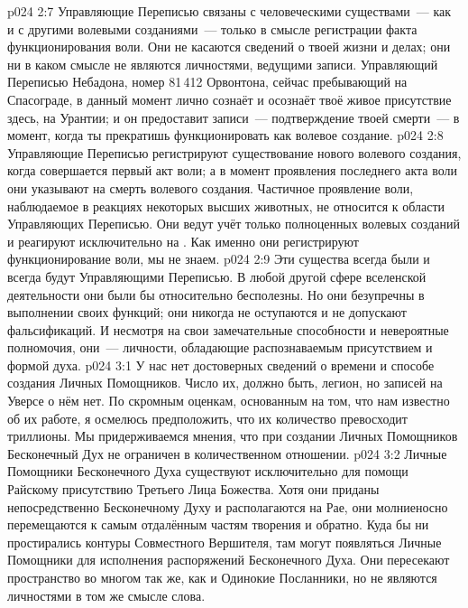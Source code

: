 \vs p024 2:7 \pc Управляющие Переписью связаны с человеческими существами~--- как и с другими волевыми созданиями~--- только в смысле регистрации факта функционирования воли. Они не касаются сведений о твоей жизни и делах; они ни в каком смысле не являются личностями, ведущими записи. Управляющий Переписью Небадона, номер 81\,412 Орвонтона, сейчас пребывающий на Спасограде, в данный момент лично сознаёт и осознаёт твоё живое присутствие здесь, на Урантии; и он предоставит записи~--- подтверждение твоей смерти~--- в момент, когда ты прекратишь функционировать как волевое создание.
\vs p024 2:8 Управляющие Переписью регистрируют существование нового волевого создания, когда совершается первый акт воли; а в момент проявления последнего акта воли они указывают на смерть волевого создания. Частичное проявление воли, наблюдаемое в реакциях некоторых высших животных, не относится к области Управляющих Переписью. Они ведут учёт только полноценных волевых созданий и реагируют исключительно на . Как именно они регистрируют функционирование воли, мы не знаем.
\vs p024 2:9 Эти существа всегда были и всегда будут Управляющими Переписью. В любой другой сфере вселенской деятельности они были бы относительно бесполезны. Но они безупречны в выполнении своих функций; они никогда не оступаются и не допускают фальсификаций. И несмотря на свои замечательные способности и невероятные полномочия, они~--- личности, обладающие распознаваемым присутствием и формой духа.
\vs p024 3:1 У нас нет достоверных сведений о времени и способе создания Личных Помощников. Число их, должно быть, легион, но записей на Уверсе о нём нет. По скромным оценкам, основанным на том, что нам известно об их работе, я осмелюсь предположить, что их количество превосходит триллионы. Мы придерживаемся мнения, что при создании Личных Помощников Бесконечный Дух не ограничен в количественном отношении.
\vs p024 3:2 Личные Помощники Бесконечного Духа существуют исключительно для помощи Райскому присутствию Третьего Лица Божества. Хотя они приданы непосредственно Бесконечному Духу и располагаются на Рае, они молниеносно перемещаются к самым отдалённым частям творения и обратно. Куда бы ни простирались контуры Совместного Вершителя, там могут появляться Личные Помощники для исполнения распоряжений Бесконечного Духа. Они пересекают пространство во многом так же, как и Одинокие Посланники, но не являются личностями в том же смысле слова.
